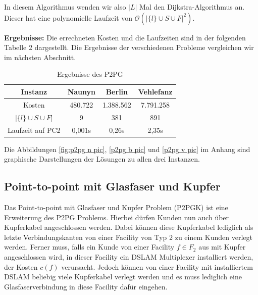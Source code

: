 \documentclass[11pt,a4paper]{article}
\theoremstyle{my_th_style1}
\begin{document}
In diesem Algorithmus wenden wir also $|L|$ Mal den Dijkstra-Algorithmus an.
Dieser hat eine polynomielle Laufzeit von \(\mathcal{O} ( {|\{l\} \cup S \cup F |}^2 )\).

\textbf{Ergebnisse:} Die errechneten Kosten und die Laufzeiten sind in der folgenden Tabelle 2 dargestellt.
Die Ergebnisse  der verschiedenen Probleme vergleichen wir im n\"achsten Abschnitt.
\begin{table}[h]
	\centering
	\begin{tabular}{c|c|c|c}
		 Instanz & Naunyn & Berlin & Vehlefanz \\	
		\hline
		Kosten & 480.722 & 1.388.562 & 7.791.258 \\
		\( |\{l\} \cup S \cup F | \) & 9 & 381 & 891 \\
		Laufzeit auf PC2 & 0,001s & 0,26s & 2,35s\\
	\end{tabular}
	\label{P2PG}
	\caption{Ergebnisse des P2PG} 
\end{table}
Die Abbildungen \eqref{fig:p2pg n pic}, \eqref{p2pg b pic} und \eqref{p2pg v pic} im Anhang sind graphische Darstellungen der L\"osungen zu allen drei Instanzen.



\subsection{Point-to-point mit Glasfaser und Kupfer}
Das Point-to-point mit Glasfaser und Kupfer Problem (P2PGK) ist eine Erweiterung des P2PG Problems.
Hierbei d\"urfen Kunden nun auch \"uber Kupferkabel angeschlossen werden.
Dabei k\"onnen diese Kupferkabel lediglich als letzte Verbindungskanten von einer Facility von Typ 2 zu einem Kunden verlegt werden.
Ferner muss, falls ein Kunde von einer Facility \(f \in F_2\) aus mit Kupfer angeschlossen wird, in dieser Facility ein DSLAM Multiplexer installiert werden, der Kosten \(c (f)\) verursacht.
Jedoch k\"onnen von einer Facility mit installiertem DSLAM beliebig viele Kupferkabel verlegt werden und es muss lediglich eine Glasfaserverbindung in diese Facility daf\"ur eingehen.
\end{document}
